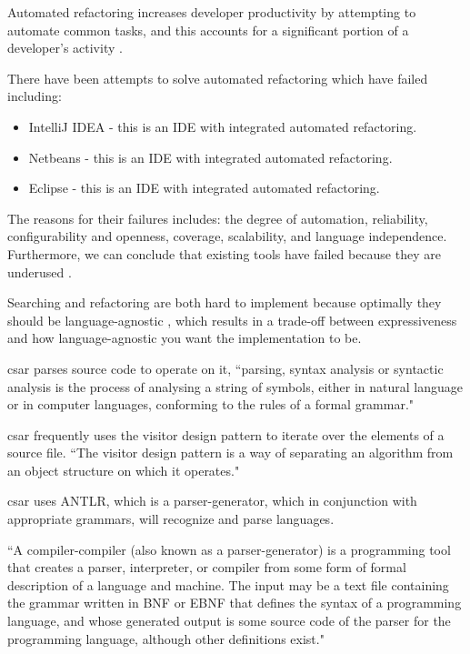 \documentclass[12pt, letterpaper]{article}
\begin{document}
Automated refactoring increases developer productivity by attempting to automate common tasks, and this accounts for a significant portion of a developer's activity \autocite{mens2004survey,murphy2012we}.

There have been attempts to solve automated refactoring which have failed including:
\begin{itemize}
  \item IntelliJ IDEA - this is an IDE with integrated automated refactoring.
  \item Netbeans - this is an IDE with integrated automated refactoring.
  \item Eclipse - this is an IDE with integrated automated refactoring.
\end{itemize}

The reasons for their failures includes: the degree of automation, reliability, configurability and openness, coverage, scalability, and language independence. \autocite{mens2004survey} Furthermore, we can conclude that existing tools have failed because they are underused \autocite{murphy2012we}.

Searching and refactoring are both hard to implement because optimally they should be language-agnostic \autocite{mens2004survey,reiss2009semantics}, which results in a trade-off between expressiveness and how language-agnostic you want the implementation to be.

csar parses source code to operate on it, ``parsing, syntax analysis or syntactic analysis is the process of analysing a string of symbols, either in natural language or in computer languages, conforming to the rules of a formal grammar." \autocite{wikipediaparsing}

csar frequently uses the visitor design pattern to iterate over the elements of a source file.
``The visitor design pattern is a way of separating an algorithm from an object structure on which it operates." \autocite{wikipediavisitorpattern}

csar uses ANTLR, which is a parser-generator, which in conjunction with appropriate grammars, will recognize and parse languages.

``A compiler-compiler (also known as a parser-generator) is a programming tool that creates a parser, interpreter, or compiler from some form of formal description of a language and machine. The input may be a text file containing the grammar written in BNF or EBNF that defines the syntax of a programming language, and whose generated output is some source code of the parser for the programming language, although other definitions exist." \autocite{wikipediacompilercompiler}
\end{document}
